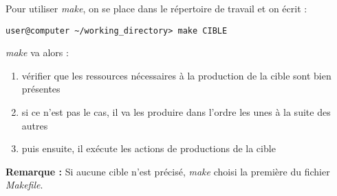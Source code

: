 \documentclass[../../../main.tex]{subfiles}
\begin{document}
Pour utiliser \textit{make}, on se place dans le répertoire de travail et on écrit :
\begin{verbatim}
user@computer ~/working_directory> make CIBLE
\end{verbatim}
\textit{make} va alors :
\begin{enumerate}
	\item vérifier que les ressources nécessaires à la production de la cible sont bien présentes
	\item si ce n'est pas le cas, il va les produire dans l'ordre les unes à la suite des autres
	\item puis ensuite, il exécute les actions de productions de la cible
\end{enumerate}
\textbf{Remarque :} Si aucune cible n'est précisé, \textit{make} choisi la première du fichier \textit{Makefile}.
 
\end{document}
